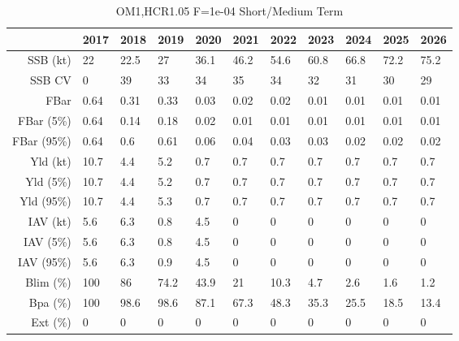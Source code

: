 \begin{table}[ht]
\centering
\begin{tabular}{rllllllllll}
  \hline
 & 2017 & 2018 & 2019 & 2020 & 2021 & 2022 & 2023 & 2024 & 2025 & 2026 \\ 
  \hline
SSB (kt) & 22 & 22.5 & 27 & 36.1 & 46.2 & 54.6 & 60.8 & 66.8 & 72.2 & 75.2 \\ 
  SSB CV & 0 & 39 & 33 & 34 & 35 & 34 & 32 & 31 & 30 & 29 \\ 
   \hline
FBar & 0.64 & 0.31 & 0.33 & 0.03 & 0.02 & 0.02 & 0.01 & 0.01 & 0.01 & 0.01 \\ 
  FBar (5\%) & 0.64 & 0.14 & 0.18 & 0.02 & 0.01 & 0.01 & 0.01 & 0.01 & 0.01 & 0.01 \\ 
  FBar (95\%) & 0.64 & 0.6 & 0.61 & 0.06 & 0.04 & 0.03 & 0.03 & 0.02 & 0.02 & 0.02 \\ 
   \hline
Yld (kt) & 10.7 & 4.4 & 5.2 & 0.7 & 0.7 & 0.7 & 0.7 & 0.7 & 0.7 & 0.7 \\ 
  Yld (5\%) & 10.7 & 4.4 & 5.2 & 0.7 & 0.7 & 0.7 & 0.7 & 0.7 & 0.7 & 0.7 \\ 
  Yld (95\%) & 10.7 & 4.4 & 5.3 & 0.7 & 0.7 & 0.7 & 0.7 & 0.7 & 0.7 & 0.7 \\ 
   \hline
IAV (kt) & 5.6 & 6.3 & 0.8 & 4.5 & 0 & 0 & 0 & 0 & 0 & 0 \\ 
  IAV (5\%) & 5.6 & 6.3 & 0.8 & 4.5 & 0 & 0 & 0 & 0 & 0 & 0 \\ 
  IAV (95\%) & 5.6 & 6.3 & 0.9 & 4.5 & 0 & 0 & 0 & 0 & 0 & 0 \\ 
   \hline
Blim (\%) & \cellcolor{red}100 & \cellcolor{red}86 & \cellcolor{red}74.2 & \cellcolor{red}43.9 & \cellcolor{red}21 & \cellcolor{red}10.3 & \cellcolor{green}4.7 & \cellcolor{green}2.6 & \cellcolor{green}1.6 & \cellcolor{green}1.2 \\ 
  Bpa (\%) & 100 & 98.6 & 98.6 & 87.1 & 67.3 & 48.3 & 35.3 & 25.5 & 18.5 & 13.4 \\ 
  Ext (\%) & 0 & 0 & 0 & 0 & 0 & 0 & 0 & 0 & 0 & 0 \\ 
   \hline
\end{tabular}
\caption{OM1,HCR1.05 F=1e-04 Short/Medium Term} 
\end{table}

